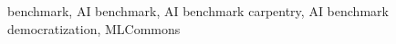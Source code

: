 \begin{abstract}
\begin{comment}
\TODO{OLD: In this document we describe the importance of benchmarks in relationship to AI and especially deep learning. Our experience is gained from working with MLCommons but also while working in educational settings as well as government settings such as the million parameter consortium headed by DOE. What we observed is that in many cases benchmarking in this domain is significantly more challenging due to a number of reasons. This includes the scale in time and space of the benchmarks, the expertise and access to hardware to run them, and the lack of experience in benchmarks in general. On the other hand it is often not yet clear to scientists how to use the benchmarks or apply them to their own applications. Therefore, efforts need to be projected to democratize such benchmark endeavors to make the more available and transparent to the users. Preparedness to use and develop such benchmarks must be accompanied by educational activities starting from the undergraduate level to the professional developers. The goal is to develop and contribute to repeatable benchmarks that can be adopted to a wide variety of applications with various scales in algorithmic complexity but also hardware requirements. The benchmarks must be communicated and collected in a fashion allowing meaningful comparisons for application users that go beyond the demonstration of them on a leadership class hardware platform.}
\end{comment}

\end{abstract}


\begin{IEEEkeywords}
benchmark, AI benchmark, AI benchmark carpentry, AI benchmark democratization, MLCommons
\end{IEEEkeywords}